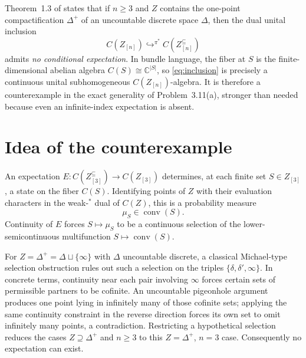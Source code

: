 \documentclass[11pt]{article}
\newcommand{\C}{\mathbb C}
\begin{document}
Theorem~1.3 of \cite{answer} states that if $n\ge3$ and $Z$ contains the
one-point compactification $\Delta^+$ of an uncountable discrete space
$\Delta$, then the dual unital inclusion
\begin{equation}\label{eq:inclusion}
 C(Z_{[n]})\mathrel{\mathop{\hookrightarrow}^{\pi^*}}
 C(Z^{\subseteq}_{[n]})
\end{equation}
admits \emph{no conditional expectation}.  In bundle language, the fiber at
$S$ is the finite-dimensional abelian algebra $C(S)\cong\C^{|S|}$, so
\eqref{eq:inclusion} is precisely a continuous unital subhomogeneous
$C(Z_{[n]})$-algebra.  It is therefore a counterexample in the exact
generality of Problem~3.11(a), stronger than needed because even an
infinite-index expectation is absent.

\section*{Idea of the counterexample}
An expectation $E:C(Z^{\subseteq}_{[3]})\to C(Z_{[3]})$ determines, at each
finite set $S\in Z_{[3]}$, a state on the fiber $C(S)$.  Identifying points of
$Z$ with their evaluation characters in the weak-$^*$ dual of $C(Z)$, this
is a probability measure
\[
 \mu_S\in\operatorname{conv}(S).
\]
Continuity of $E$ forces $S\mapsto\mu_S$ to be a continuous selection of the
lower-semicontinuous multifunction
\(
 S\mapsto\operatorname{conv}(S)
\).

For $Z=\Delta^+=\Delta\sqcup\{\infty\}$ with $\Delta$ uncountable discrete,
a classical Michael-type selection obstruction rules out such a selection on
the triples $\{\delta,\delta',\infty\}$.  In concrete terms, continuity near
each pair involving $\infty$ forces certain sets of permissible partners to
be cofinite.  An uncountable pigeonhole argument produces one point lying in
infinitely many of those cofinite sets; applying the same continuity
constraint in the reverse direction forces its own set to omit infinitely
many points, a contradiction.  Restricting a hypothetical selection reduces
the cases $Z\supseteq\Delta^+$ and $n\ge3$ to this $Z=\Delta^+$, $n=3$ case.
Consequently no expectation can exist.
\end{document}
